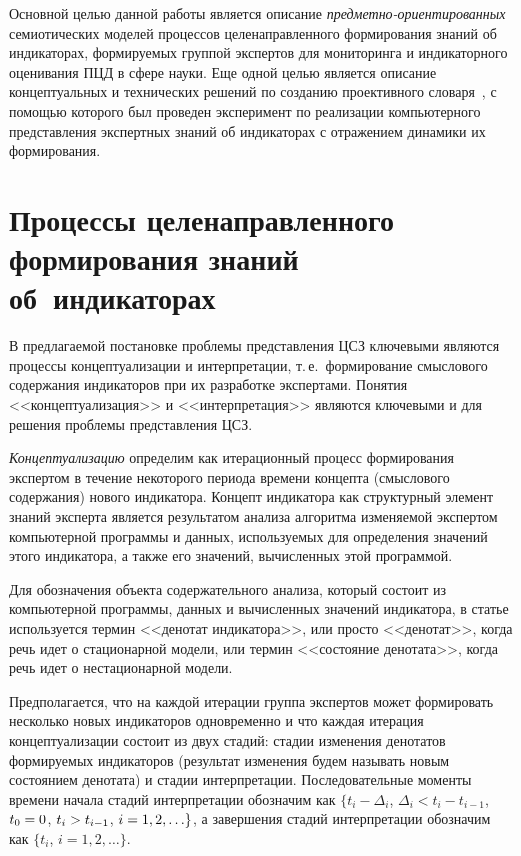 \begin{multicols}{2}
   Основной целью данной работы является описание \textit{предметно-ориентированных} 
семиотических моделей процессов целенаправленного формирования знаний об 
индикаторах, формируемых группой экспертов для мониторинга и индикаторного 
оценивания ПЦД в сфере науки. Еще одной целью является описание концептуальных и 
технических решений по созданию проективного словаря~\cite{18-zat}, с помощью которого 
был проведен эксперимент по реализации компьютерного представления экспертных знаний 
об индикаторах с отражением динамики их формирования.

\section{Процессы целенаправленного формирования знаний 
об~индикаторах}

   В предлагаемой постановке проблемы пред\-став\-ле\-ния ЦСЗ ключевыми являются 
процессы концептуализации и интерпретации, т.\,е.\ формирование смыслового содержания 
индикаторов при их разработке экспертами. Понятия <<концептуализация>> и 
<<интерпретация>> являются ключевыми и для решения проблемы представления ЦСЗ.
   
   \textit{Концептуализацию} определим как итерационный процесс формирования 
экспертом в течение некоторого периода времени концепта (смыслового содержания) нового 
индикатора. Концепт индикатора как структурный элемент знаний эксперта является 
результатом анализа алгоритма из\-ме\-ня\-емой экспертом компьютерной программы и данных, 
используемых для определения значений этого индикатора, а также его значений, 
вычисленных этой программой.
   
   Для обозначения объекта содержательного анализа, который состоит из компьютерной 
программы, данных и вычисленных значений индикатора, в статье используется термин 
<<денотат индикатора>>, или просто <<денотат>>, когда речь идет о стационарной модели, 
или термин <<состояние денотата>>, когда речь идет о нестационарной модели.
   
   Предполагается, что на каждой итерации группа экспертов может формировать несколько 
новых индикаторов одновременно и что каждая итерация концептуализации состоит из двух 
стадий: стадии изменения денотатов формируемых индикаторов (результат изменения будем 
называть новым состоянием денотата) и стадии интерпретации. Последовательные моменты 
времени начала стадий интерпретации обозначим как $\{t_i -\Delta_i$, $\Delta_i <t_i - 
   t_{i-1}$, $t_0\hm=0$, $t_i \hm> t_{i-1}$, $i\hm=1, 2, \ldots\}$, а завершения стадий интерпретации 
обозначим как $\{t_i$, $i=1, 2, \ldots\}$.
   

\end{multicols}
